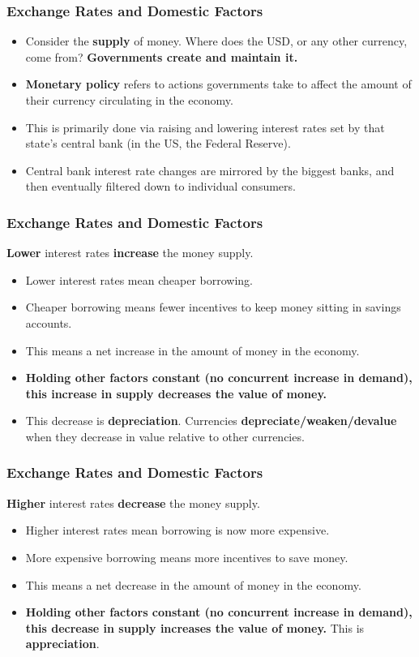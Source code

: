 \documentclass{beamer}
\begin{document}
\begin{frame} 
	\frametitle{\LARGE{Exchange Rates and Domestic Factors}}
	\begin{itemize}
		\item Consider the \textbf{supply} of money. Where does the USD, or any other currency, come from? \pause \textbf{Governments create and maintain it.} \pause
		\item \textbf{Monetary policy} refers to actions governments take to affect the amount of their currency circulating in the economy. \pause
		\item This is primarily done via raising and lowering interest rates set by that state's central bank (in the US, the Federal Reserve). \pause
		\item Central bank interest rate changes are mirrored by the biggest banks, and then eventually filtered down to individual consumers. 
	\end{itemize}
\end{frame}

\begin{frame} 
	\frametitle{\LARGE{Exchange Rates and Domestic Factors}}
	\textbf{Lower} interest rates \textbf{increase} the money supply.
		\begin{itemize}
			\item Lower interest rates mean cheaper borrowing. \pause
			\item Cheaper borrowing means fewer incentives to keep money sitting in savings accounts. \pause
			\item This means a net increase in the amount of money in the economy.
			\item \textbf{Holding other factors constant (no concurrent increase in demand), this increase in supply decreases the value of money.}
			\item This decrease is \textbf{depreciation}. Currencies \textbf{depreciate/weaken/devalue} when they decrease in value relative to other currencies. 
		\end{itemize}
\end{frame}

\begin{frame} 
	\frametitle{\LARGE{Exchange Rates and Domestic Factors}}
	\textbf{Higher} interest rates \textbf{decrease} the money supply.
	\begin{itemize}
		\item Higher interest rates mean borrowing is now more expensive. \pause
		\item More expensive borrowing means more incentives to save money. \pause
		\item This means a net decrease in the amount of money in the economy.
		\item \textbf{Holding other factors constant (no concurrent increase in demand), this decrease in supply increases the value of money.} This is \textbf{appreciation}.
	\end{itemize}
\end{frame}
\end{document}
